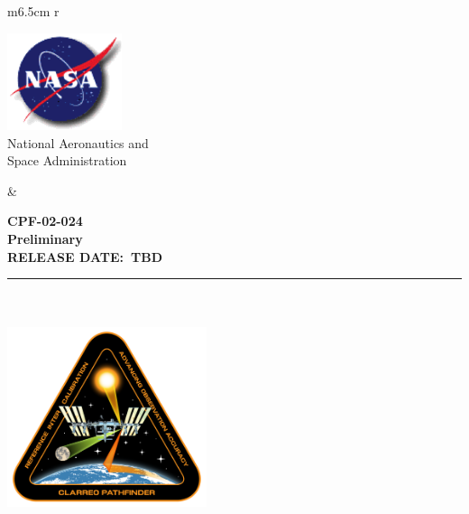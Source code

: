 \documentclass[12pt,oneside,oldfontcommands]{memoir}
\date[\mydate]{\today}
\title{\mycpftitle}
\author{\myauthor}
\date{\mydate}
\def\releasedate{TBD}
\def\documentnumber{CPF-02-024}
\def\titlepagerevision{PRELIMINARY}
\def\revision{Preliminary  }
\def\titlepagerevision{\revision}
\begin{document}


\mainmatter
\VerbatimFootnotes


%
%
\captionnamefont{\small\sffamily}
\captiontitlefont{\small\sffamily}
\renewcommand\thefigure{\thesection-\arabic{figure}} 
\renewcommand\thetable{\thesection-\arabic{table}}
%
%

% 

\thispagestyle{firststyle}
\sffamily
\setlength\voffset{-18pt}
\setlength{\floatsep}{10pt plus 1.0pt minus 2.0pt}
\vspace{-0.25in}
\begin{table}[h!]
  \begin{tabular}{ m{6.5cm} r }
    \begin{minipage}{4in}
      \includegraphics[width=1.32in, height=1.12in]{meatball.png}\\
        \textsf{\noindent
        \footnotesize{National Aeronautics and\\
        \vspace{-5pt}Space Administration}
        }

    \end{minipage}
    &
    \begin{minipage}[t]{10cm}
    \vspace{0.3in}
    \sffamily
    \raggedleft\Large\bfseries \documentnumber\\
    \normalsize \MakeUppercase \titlepagerevision\\
    \raggedleft\bfseries
    RELEASE DATE:~\MakeTextUppercase\releasedate
    \end{minipage}
  \end{tabular}
\end{table}
\vspace{-0.3in}
\rule{\linewidth}{2.25pt}
~\\
~\\
\vspace{0.42in}
\centering
\includegraphics[keepaspectratio,width=2.3in]{cpf_logo.png}
\end{document}
